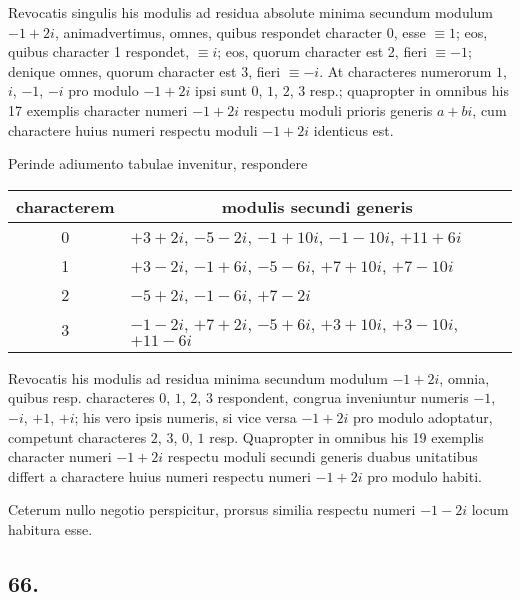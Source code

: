 \documentclass[twoside,12pt]{memoir}
\begin{document}
Revocatis singulis his modulis ad residua absolute minima secundum modulum \(-1+2 i\), animadvertimus, omnes, quibus respondet character \(0\), esse \(\equiv 1\); eos, quibus character 1 respondet, \(\equiv i\); eos, quorum character est 2, fieri \(\equiv-1\); denique omnes, quorum character est 3, fieri \(\equiv-i\). At characteres numerorum \(1\), \( i\), \(-1\), \(-i\) pro modulo \(-1+2 i\) ipsi sunt \(0\), \(1\), \(2\), \(3\) resp.; quapropter in omnibus his 17 exemplis character numeri \(-1+2 i\) respectu moduli prioris generis \(a+b i\), cum charactere huius numeri respectu moduli \(-1+2 i\) identicus est.

Perinde adiumento tabulae invenitur, respondere
\begin{center}
\begin{tabular}{c|l}
characterem & \multicolumn{1}{c}{modulis secundi generis} \\
\hline
0 & \(+3+2 i\), \(-5-2 i\), \(-1+10 i\), \(-1-10 i\), \(+11+6 i\) \\
1 & \(+3-2 i\), \(-1+6 i\), \(-5-6 i\), \(+7+10 i\), \(+7-10 i\) \\
2 & \(-5+2 i\), \(-1-6 i\), \(+7-2 i\) \\
3 & \(-1-2 i\), \(+7+2 i\), \(-5+6 i\), \(+3+10 i\), \(+3-10 i\), \(+11-6 i\) \\
\end{tabular}
\end{center}
 
Revocatis his modulis ad residua minima secundum modulum \(-1+2 i\), omnia, quibus resp. characteres \(0\), \(1\), \(2\), \(3\) respondent, congrua inveniuntur numeris \(-1\), \(-i\), \(+1\), \(+i\); his vero ipsis numeris, si vice versa \(-1+2 i\) pro modulo adoptatur, competunt characteres \(2\), \(3\), \(0\), \(1\) resp. Quapropter in omnibus his 19 exemplis character numeri \(-1+2 i\) respectu moduli secundi generis duabus unitatibus differt a charactere huius numeri respectu numeri \(-1+2 i\) pro modulo habiti.
 
Ceterum nullo negotio perspicitur, prorsus similia respectu numeri \(-1-2 i\) locum habitura esse.

\subsection*{66.}
 
\end{document}
